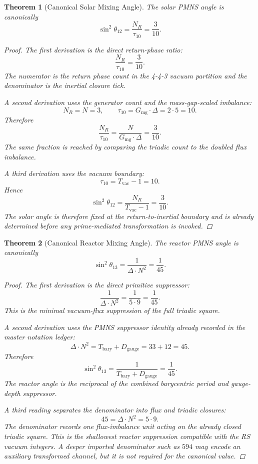 \documentclass[11pt, letterpaper]{article}
\theoremstyle{definition}
\theoremstyle{plain}
\newtheorem{theorem}{Theorem}[section]
\begin{document}
\begin{theorem}[Canonical Solar Mixing Angle]
The solar PMNS angle is canonically
\[
\sin^2\theta_{12} = \frac{N_R}{\tau_{10}} = \frac{3}{10}.
\]

\begin{proof}
The first derivation is the direct return-phase ratio:
\[
\frac{N_R}{\tau_{10}} = \frac{3}{10}.
\]
The numerator is the return phase count in the 4-4-3 vacuum partition and the
denominator is the inertial closure tick.

A second derivation uses the generator count and the mass-gap-scaled imbalance:
\[
N_R = N = 3, \qquad \tau_{10} = G_{\mathrm{mg}} \cdot \Delta = 2 \cdot 5 = 10.
\]
Therefore
\[
\frac{N_R}{\tau_{10}}
=
\frac{N}{G_{\mathrm{mg}} \cdot \Delta}
=
\frac{3}{10}.
\]
The same fraction is reached by comparing the triadic count to the doubled
flux imbalance.

A third derivation uses the vacuum boundary:
\[
\tau_{10} = T_{\mathrm{vac}} - 1 = 10.
\]
Hence
\[
\sin^2\theta_{12}
=
\frac{N_R}{T_{\mathrm{vac}} - 1}
=
\frac{3}{10}.
\]
The solar angle is therefore fixed at the return-to-inertial boundary and is
already determined before any prime-mediated transformation is invoked.
\end{proof}
\end{theorem}

\begin{theorem}[Canonical Reactor Mixing Angle]
The reactor PMNS angle is canonically
\[
\sin^2\theta_{13} = \frac{1}{\Delta \cdot N^2} = \frac{1}{45}.
\]

\begin{proof}
The first derivation is the direct primitive suppressor:
\[
\frac{1}{\Delta \cdot N^2} = \frac{1}{5 \cdot 9} = \frac{1}{45}.
\]
This is the minimal vacuum-flux suppression of the full triadic square.

A second derivation uses the PMNS suppressor identity already recorded in the
master notation ledger:
\[
\Delta \cdot N^2 = T_{\mathrm{bary}} + D_{\mathrm{gauge}} = 33 + 12 = 45.
\]
Therefore
\[
\sin^2\theta_{13}
=
\frac{1}{T_{\mathrm{bary}} + D_{\mathrm{gauge}}}
=
\frac{1}{45}.
\]
The reactor angle is the reciprocal of the combined barycentric period and
gauge-depth suppressor.

A third reading separates the denominator into flux and triadic closures:
\[
45 = \Delta \cdot N^2 = 5 \cdot 9.
\]
The denominator records one flux-imbalance unit acting on the already closed
triadic square. This is the shallowest reactor suppression compatible with the
RS vacuum integers. A deeper imported denominator such as $594$ may encode an
auxiliary transformed channel, but it is not required for the canonical value.
\end{proof}
\end{theorem}
\end{document}
